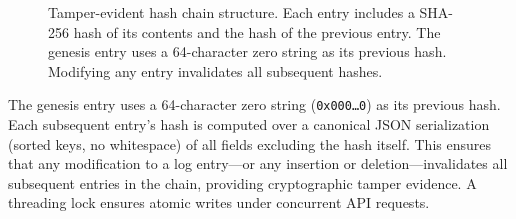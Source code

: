 \documentclass[conference]{IEEEtran}
\begin{document}
\begin{figure}[htbp]
\centering
{}
\caption{Tamper-evident hash chain structure. Each entry includes a SHA-256 hash of its contents and the hash of the previous entry. The genesis entry uses a 64-character zero string as its previous hash. Modifying any entry invalidates all subsequent hashes.}
\label{fig:hashchain}
\end{figure}

The genesis entry uses a 64-character zero string (\texttt{0x000\dots0}) as its previous hash. Each subsequent entry's hash is computed over a canonical JSON serialization (sorted keys, no whitespace) of all fields excluding the hash itself. This ensures that any modification to a log entry---or any insertion or deletion---invalidates all subsequent entries in the chain, providing cryptographic tamper evidence. A threading lock ensures atomic writes under concurrent API requests.
\end{document}
